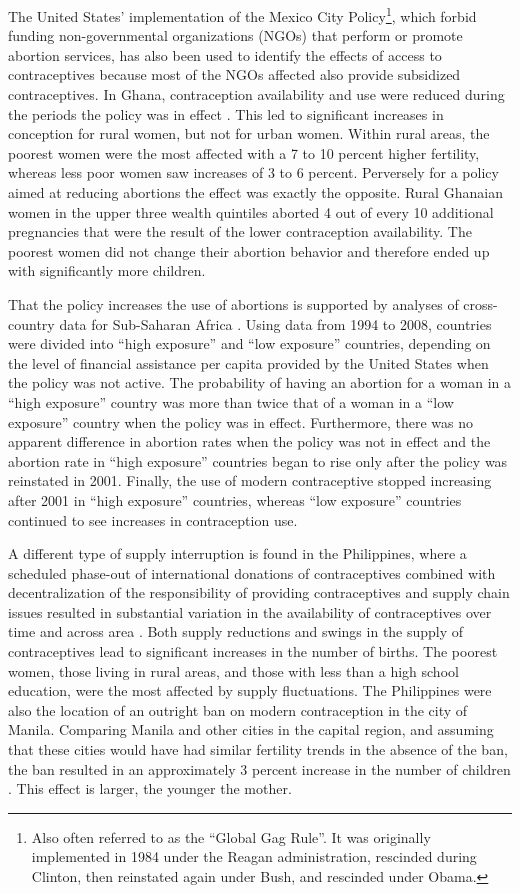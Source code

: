 The United States' implementation of the Mexico City Policy\footnote{Also often referred to as the ``Global Gag Rule''. It was originally implemented in 1984 under the Reagan administration, rescinded during Clinton, then reinstated again under Bush, and rescinded under Obama.}, which forbid funding non-governmental organizations (NGOs) that perform or promote abortion services, has also been used to identify the effects of access to contraceptives because most of the NGOs affected also provide subsidized contraceptives. In Ghana, contraception availability and use were reduced during the periods the policy was in effect \citep{Jones2015}. This led to significant increases in conception for rural women, but not for urban women. Within rural areas, the poorest women were the most affected with a 7 to 10 percent higher fertility, whereas less poor women saw increases of 3 to 6 percent. Perversely for a policy aimed at reducing abortions the effect was exactly the opposite. Rural Ghanaian women in the upper three wealth quintiles aborted 4 out of every 10 additional pregnancies that were the result of the lower contraception availability. The poorest women did not change their abortion behavior and therefore ended up with significantly more children.

That the policy increases the use of abortions is supported by analyses of cross-country data for Sub-Saharan Africa \citep{Bendavid2011}. Using data from 1994 to 2008, countries were divided into ``high exposure'' and ``low exposure'' countries, depending on the level of financial assistance per capita provided by the United States when the policy was not active. The probability of having an abortion for a woman in a ``high exposure'' country was more than twice that of a woman in a ``low exposure'' country when the policy was in effect. Furthermore, there was no apparent difference in abortion rates when the policy was not in effect and the abortion rate in ``high exposure'' countries began to rise only after the policy was reinstated in 2001. Finally, the use of modern contraceptive stopped increasing after 2001 in ``high exposure'' countries, whereas ``low exposure'' countries continued to see increases in contraception use.

A different type of supply interruption is found in the Philippines, where a scheduled phase-out of international donations of contraceptives combined with decentralization of the responsibility of providing contraceptives and supply chain issues resulted in substantial variation in the availability of contraceptives over time and across area \citep{Salas2014}. Both supply reductions and swings in the supply of contraceptives lead to significant increases in the number of births. The poorest women, those living in rural areas, and those with less than a high school education, were the most affected by supply fluctuations. The Philippines were also the location of an outright ban on modern contraception in the city of Manila. Comparing Manila and other cities in the capital region, and assuming that these cities would have had similar fertility trends in the absence of the ban, the ban resulted in an approximately 3 percent increase in the number of children \citep{Dumas2017}. This effect is larger, the younger the mother.

